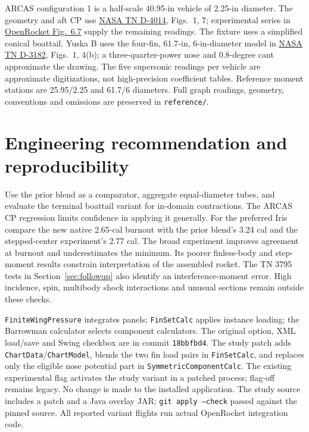 \documentclass[10pt,letterpaper]{article}
\newcommand{\sub}[1]{\smallskip\noindent{\bfseries\color{navy}#1}\quad}
\begin{document}
\sub{Wind-tunnel provenance.} ARCAS configuration 1 is a half-scale 40.95-in vehicle of 2.25-in diameter. The geometry and aft CP use \href{https://ntrs.nasa.gov/citations/19670020031}{NASA TN D-4014}, Figs.\ 1, 7; experimental series in \href{https://openrocket.sourceforge.net/techdoc.pdf\#page=103}{OpenRocket Fig.\ 6.7} supply the remaining readings. The fixture uses a simplified conical boattail. Yuska B uses the four-fin, 61.7-in, 6-in-diameter model in \href{https://ntrs.nasa.gov/citations/19660004864}{NASA TN D-3182}, Figs.\ 1, 4(b); a three-quarter-power nose and 0.8-degree cant approximate the drawing. The five supersonic readings per vehicle are approximate digitizations, not high-precision coefficient tables. Reference moment stations are 25.95/2.25 and 61.7/6 diameters. Full graph readings, geometry, conventions and omissions are preserved in \texttt{reference/}.
\clearpage

\clearpage
\clearpage\section{Engineering recommendation and reproducibility}
Use the prior blend as a comparator, aggregate equal-diameter tubes, and evaluate the terminal boattail variant for in-domain contractions. The ARCAS CP regression limits confidence in applying it generally. For the preferred Iris compare the new native 2.65-cal burnout with the prior blend's 3.24 cal and the stepped-center experiment's 2.77 cal. The broad experiment improves agreement at burnout and underestimates the minimum. Its poorer finless-body and step-moment results constrain interpretation of the assembled rocket. The TN 3795 tests in Section~\ref{sec:followup} also identify an interference-moment error. High incidence, spin, multibody shock interactions and unusual sections remain outside these checks.

\sub{Code map.} \texttt{FiniteWingPressure} integrates panels; \texttt{FinSetCalc} applies instance loading; the Barrowman calculator selects component calculators. The original option, XML load/save and Swing checkbox are in commit \texttt{18bbfbd4}. The study patch adds \texttt{ChartData}/\texttt{ChartModel}, blends the two fin load pairs in \texttt{FinSetCalc}, and replaces only the eligible nose potential part in \texttt{SymmetricComponentCalc}. The existing experimental flag activates the study variant in a patched process; flag-off remains legacy. No change is made to the installed application. The study source includes a patch and a Java overlay JAR; \texttt{git apply --check} passed against the pinned source. All reported variant flights run actual OpenRocket integration code.
\end{document}
